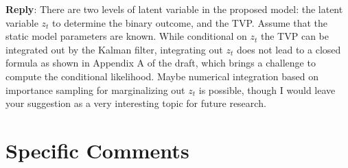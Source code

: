 \documentclass[12pt]{article}
\begin{document}
\begin{itemize}
\textbf{Reply}: There are two levels of latent variable in the proposed model: the latent variable $z_t$ to determine the binary outcome, and the TVP. Assume that the static model parameters are known. While conditional on $z_t$ the TVP can be integrated out by the Kalman filter, integrating out $z_t$ does not lead to a closed formula as shown in Appendix A of the draft, which brings a challenge to compute the conditional likelihood. Maybe numerical integration based on importance sampling for marginalizing out $z_t$ is possible, though I would leave your suggestion as a very interesting topic for future research.  
\end{itemize}



\section*{Specific Comments}
\end{document}
